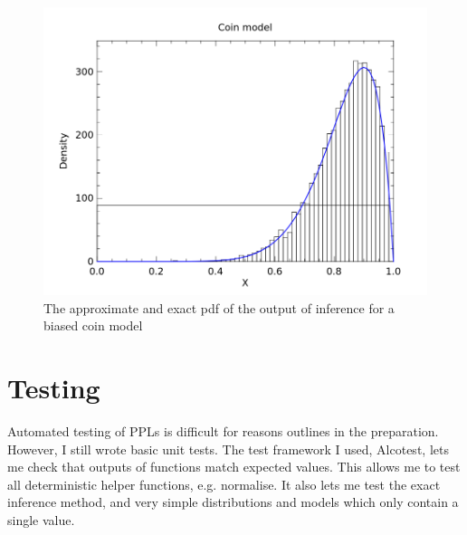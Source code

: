\begin{figure}[!htb]
	\centering
													
	\begin{minipage}{0.45\textwidth}
		\centering
		\inputminted{ocaml}{code_snippets/plotter.ml}	
	\end{minipage}
	\begin{minipage}{0.45\textwidth}
		\centering
		\includegraphics[width=\linewidth]{figs/coin_compare.png}
	\end{minipage}
													
	\caption{The approximate and exact pdf of the output of inference for a biased coin model}
	\label{fig:vis-samples}
\end{figure}


\section{Testing}

Automated testing of PPLs is difficult for reasons outlines in the preparation. However, I still wrote basic unit tests. The test framework I used, Alcotest, lets me check that outputs of functions match expected values. This allows me to test all deterministic helper functions, e.g. normalise. It also lets me test the exact inference method, and very simple distributions and models which only contain a single value.

